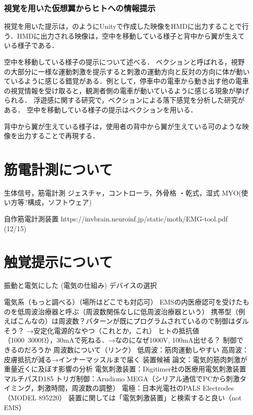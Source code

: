     \subsubsection{視覚を用いた仮想翼からヒトへの情報提示}
 
        視覚を用いた提示は，のようにUnityで作成した映像をHMDに出力することで行う．HMDに出力される映像は，空中を移動している様子と背中から翼が生えている様子である．

        空中を移動している様子の提示について述べる．
        ベクションと呼ばれる，視野の大部分に一様な運動刺激を提示すると刺激の運動方向と反対の方向に体が動いているように感じる錯覚がある\cite{妹尾武治2014ベクションとその周辺の近年の動向}．例として，停車中の電車から動き出す他の電車の視覚情報を受け取ると，観測者側の電車が動いているように感じる現象が挙げられる．
        浮遊感に関する研究で，ベクションによる落下感覚を分析した研究がある\cite{奥川夏輝2017VR空間における視覚刺激によって発生する落下感覚の分析}．
        空中を移動している様子の提示はベクションを用いる．

        背中から翼が生えている様子は，使用者の背中から翼が生えている可のような映像を出力することで再現する．  


\section{筋電計測について}
    生体信号，筋電計測
    ジェスチャ，コントローラ，外骨格
    ・乾式，湿式
    MYO(使い方等?構成，ソフトウェア)

    自作筋電計測装置
    https://invbrain.neuroinf.jp/static/moth/EMG-tool.pdf
    (12/15)





\section{触覚提示について}
    振動と電気にした
    (電気の仕組み)
    デバイスの選択

    電気系（もっと調べる）（場所はどこでも対応可）
EMSの内医療認可を受けたものを低周波治療器と呼ぶ（周波数関係なしに低周波治療器という）
携帯型（例えばこんなの）は周波数？パターンが既にプログラムされているので制御はダルそう？
→安定化電源的なやつ（これとか，これ）
ヒトの抵抗値（1000~3000Ω），30mAで死ねる．→なのになぜ1000V, 100mA出せる？
制御できるのだろうか
周波数について（リンク）
低周波：筋肉運動しやすい
高周波：皮膚抵抗が減る→インナーマッスルまで届く
装置候補
論文：電気的筋肉刺激が重量近くに及ぼす影響の分析
電気刺激装置：Digitimer社の医療用電気刺激装置マルチパスD185
トリガ制御：Arudiono MEGA（シリアル通信でPCから刺激タイミング，刺激時間，周波数の調整）
電極：日本光電社のPALS Electrodes（MODEL 895220）
装置に関しては「電気刺激装置」と検索すると良い（not EMS）


